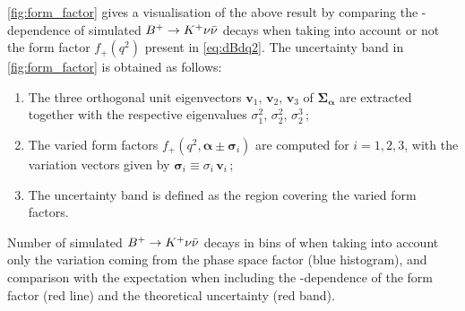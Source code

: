 \cref{fig:form_factor} gives a visualisation of the above result by comparing the \qq-dependence of simulated $B^+\rightarrow K^+\nu\bar{\nu}$ decays when taking into account or not the form factor $f_+(q^2)$ present in \cref{eq:dBdq2}.
The uncertainty band in \cref{fig:form_factor} is obtained as follows:
\begin{enumerate}
\item The three orthogonal unit eigenvectors $\boldsymbol{v}_1,\,\boldsymbol{v}_2,\,\boldsymbol{v}_3$ of $\boldsymbol{\Sigma}_{\boldsymbol{\alpha}}$ are extracted together with the respective eigenvalues $\sigma^2_1,\,\sigma^2_2,\,\sigma^3_2$\,;
\item The varied form factors $f_+(q^2,\boldsymbol{\alpha}\pm\boldsymbol{\sigma}_i)$ are computed for $i=1,2,3$, with the variation vectors given by $\boldsymbol{\sigma}_i\equiv\sigma_i\,\boldsymbol{v}_i$\,;
\item The uncertainty band is defined as the region covering the varied form factors.
\end{enumerate}

{
Number of simulated $B^+\rightarrow K^+\nu\bar{\nu}$ decays in bins of \qq when taking into account only the variation coming from the phase space factor (blue histogram), and comparison with the expectation when including the \qq-dependence of the form factor (red line) and the theoretical uncertainty (red band).}
